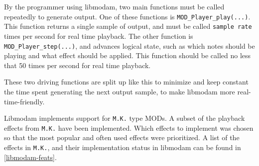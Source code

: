 By the programmer using libmodam, two main functions must be called repeatedly to generate output.
One of these functions is \texttt{MOD\_Player\_play(...)}.
This function returns a single sample of output, and must be called \texttt{sample rate} times per second for real time playback.
The other function is \texttt{MOD\_Player\_step(...)}, and advances logical state, such as which notes should be playing and what effect should be applied.
This function should be called no less that 50 times per second for real time playback.

These two driving functions are split up like this to minimize and keep constant the time spent generating the next output sample, to make libmodam more real-time-friendly.

Libmodam implements support for \texttt{M.K.} type MODs.
A subset of the playback effects from \texttt{M.K.} have been implemented.
Which effects to implement was chosen so that the most popular and often used effects were prioritized.
A list of the effects in \texttt{M.K.}, and their implementation status in libmodam can be found in \ref{libmodam-feats}.

